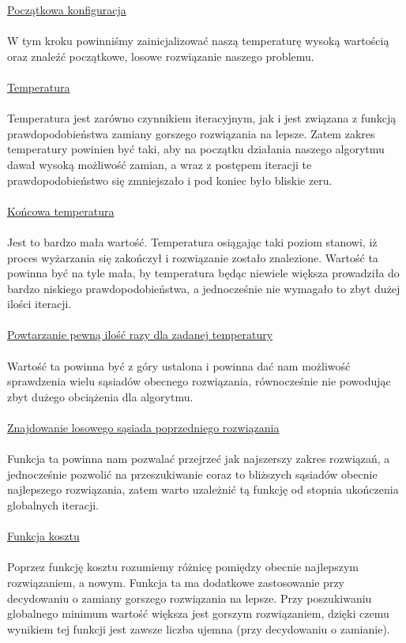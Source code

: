 \documentclass[twoside]{projektInzynierskiMS1}
\newcommand{\newLine}{~\\}
\newcommand{\si}{ś}
\begin{document}
\noindent \underline{Początkowa konfiguracja} \\ \newLine
\indent W tym kroku powinniśmy zainicjalizować naszą temperaturę wysoką wartością oraz znaleźć początkowe, losowe rozwiązanie naszego problemu. 
\\ \newLine

\noindent \underline{Temperatura} \\ \newLine
\indent Temperatura jest zarówno czynnikiem iteracyjnym, jak i jest związana z funkcją prawdopodobieństwa zamiany gorszego rozwiązania na lepsze. Zatem zakres temperatury powinien być taki, aby na początku działania naszego algorytmu dawał wysoką możliwość zamian, a wraz z postępem iteracji te prawdopodobieństwo się zmniejszało i pod koniec było bliskie zeru.\\ \newLine


\noindent \underline{Końcowa temperatura} \\ \newLine
\indent Jest to bardzo mała wartość. Temperatura osiągając taki poziom stanowi, iż proces wyżarzania się zakończył i rozwiązanie zostało znalezione.
Wartość ta powinna być na tyle mała, by temperatura będąc niewiele większa prowadziła do bardzo niskiego prawdopodobieństwa, a jednocze\si nie nie wymagało to zbyt dużej ilo\si ci iteracji. \\ \newLine


\noindent \underline{Powtarzanie pewną ilość razy dla zadanej temperatury} \\ \newLine
\indent Wartość ta powinna być z góry ustalona i powinna dać nam możliwość sprawdzenia wielu sąsiadów obecnego rozwiązania, równocześnie nie powodując zbyt dużego obciążenia dla algorytmu.\\ \newLine


\noindent \underline{Znajdowanie losowego sąsiada poprzedniego rozwiązania} \\ \newLine
\indent Funkcja ta powinna nam pozwalać przejrzeć jak najszerszy zakres rozwiązań, a jednocze\si nie pozwolić na przeszukiwanie coraz to bliższych sąsiadów obecnie najlepszego rozwiązania, zatem warto uzależnić tą funkcję od stopnia ukończenia globalnych iteracji.\\ \newLine


\noindent \underline{Funkcja kosztu} \\ \newLine
\indent Poprzez funkcję kosztu rozumiemy różnicę pomiędzy obecnie najlepszym rozwiązaniem, a nowym. Funkcja ta ma dodatkowe zastosowanie przy decydowaniu o zamiany gorszego rozwiązania na lepsze. Przy poszukiwaniu globalnego minimum warto\si ć większa jest gorszym rozwiązaniem, dzięki czemu wynikiem tej funkcji jest zawsze liczba ujemna (przy decydowaniu o zamianie). \\ \newLine  \\ \newLine
\end{document}
